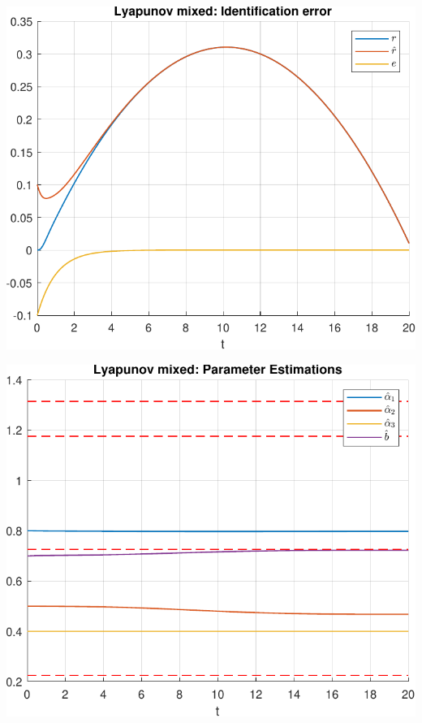 \documentclass[a4paper,12pt]{article}
\begin{document}
\begin{minipage}[t]{0.45\textwidth}
    \centering
    \includegraphics[width=\linewidth]{plot/task2_identification_error.pdf}
    \label{fig:task2_identification_error}
\end{minipage}%
\hfill
\begin{minipage}[t]{0.45\textwidth}
    \centering
    \includegraphics[width=\linewidth]{plot/task2_parameter_estimations.pdf}
    \label{fig:task2_parameter_estimations}
\end{minipage}
\end{document}
